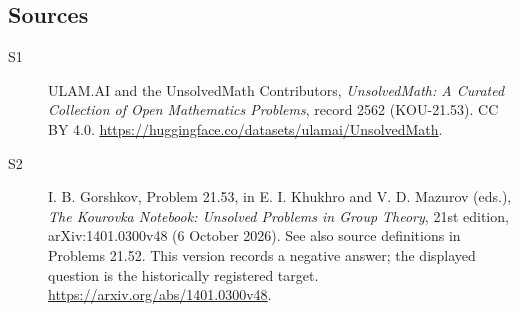\documentclass[11pt]{article}
\begin{document}
\subsection{Sources}
\begin{description}
\item[\hypertarget{source:2562:1}{S1}] ULAM.AI and the UnsolvedMath Contributors, \emph{UnsolvedMath: A Curated Collection of Open Mathematics Problems}, record 2562 (KOU-21.53). CC BY 4.0. \url{https://huggingface.co/datasets/ulamai/UnsolvedMath}.
\item[\hypertarget{source:2562:2}{S2}] I. B. Gorshkov, Problem 21.53, in E. I. Khukhro and V. D. Mazurov (eds.), \emph{The Kourovka Notebook: Unsolved Problems in Group Theory}, 21st edition, arXiv:1401.0300v48 (6 October 2026). See also source definitions in Problems 21.52. This version records a negative answer; the displayed question is the historically registered target. \url{https://arxiv.org/abs/1401.0300v48}.
\end{description}
\label{end:2562}
\end{document}
